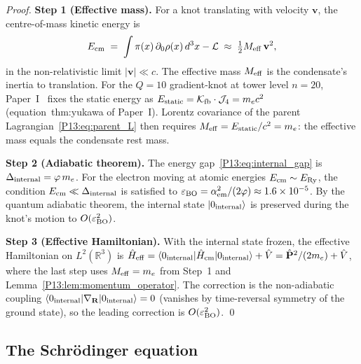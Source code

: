 \documentclass[11pt,a4paper]{article}
\theoremstyle{definition}
\theoremstyle{remark}
\newcommand{\vp}{\varphi}
\newcommand{\ERy}{E_{\mathrm{Ry}}}
\newcommand{\aem}{\alpha_{\mathrm{em}}}
\newcommand{\eps}{\varepsilon}
\begin{document}
\begin{proof}
\textbf{Step 1 (Effective mass).}
For a knot translating with velocity $\mathbf{v}$,
the centre-of-mass kinetic energy is
\begin{equation}
  E_{\rm cm}
  \;=\; \int\pi(x)\,\partial_0\rho(x)\,d^3x - \mathcal{L}
  \;\approx\; \tfrac{1}{2}M_{\rm eff}\,\mathbf{v}^2,
  \label{P13:eq:E_cm}
\end{equation}
in the non-relativistic limit $|\mathbf{v}|\ll c$.
The effective mass $M_{\rm eff}$ is the condensate's
inertia to translation.
For the $Q=10$ gradient-knot at tower level $n=20$,
Paper~I~\cite{Paper1} fixes the static energy as
$E_{\rm static} = \mathcal{K}_{\rm fb}\cdot\mathcal{J}_4 = m_e c^2$
(equation~thm:yukawa of Paper~I).
Lorentz covariance of the parent
Lagrangian~\eqref{P13:eq:parent_L} then requires $M_{\rm eff}=E_{\rm static}/c^2=m_e$:
the effective mass equals the condensate rest mass.

\textbf{Step 2 (Adiabatic theorem).}
The energy gap~\eqref{P13:eq:internal_gap} is $\Delta_{\rm internal}=\vp\,m_e$.
For the electron moving at atomic energies $E_{\rm cm}\sim\ERy$,
the condition $E_{\rm cm}\ll\Delta_{\rm internal}$ is satisfied to
$\eps_{\rm BO} = \aem^2/(2\vp)\approx1.6\times10^{-5}$.
By the quantum adiabatic theorem, the internal state $|0_{\rm internal}\rangle$
is preserved during the knot's motion to $O(\eps_{\rm BO}^2)$.

\textbf{Step 3 (Effective Hamiltonian).}
With the internal state frozen, the effective Hamiltonian on
$L^2(\mathbb{R}^3)$ is
$\hat{H}_{\rm eff}
= \langle 0_{\rm internal}|\hat{H}_{\rm cm}|0_{\rm internal}\rangle+\hat{V}
= \hat{\mathbf{P}}^2/(2m_e)+\hat{V}$,
where the last step uses $M_{\rm eff}=m_e$ from Step~1
and Lemma~\ref{P13:lem:momentum_operator}.
The correction is the non-adiabatic coupling
$\langle 0_{\rm internal}|\nabla_\mathbf{R}|0_{\rm internal}\rangle=0$
(vanishes by time-reversal symmetry of the ground state),
so the leading correction is $O(\eps_{\rm BO}^2)$.
\qed
\end{proof}

\subsection{The Schr\"odinger equation}
\label{P13:sec:schrodinger_eq}
\end{document}
